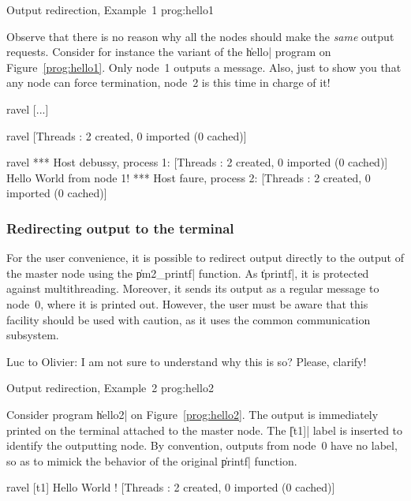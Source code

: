  {Output redirection,
  Example~1} {prog:hello1}

Observe that there is no reason why all the nodes should make the
\emph{same} output requests. Consider for instance the variant of the
\|hello| program on Figure~\ref{prog:hello1}. Only node~1 outputs a
message.  Also, just to show you that any node can force termination,
node~2 is this time in charge of it!
\begin{shell}
ravel%
[...]

ravel%
[Threads : 2 created, 0 imported (0 cached)]

ravel%
*** Host debussy, process 1:
[Threads : 2 created, 0 imported (0 cached)]
Hello World from node 1!
*** Host faure, process 2:
[Threads : 2 created, 0 imported (0 cached)]
\end{shell}

\subsubsection{Redirecting output to the terminal}

For the user convenience, it is possible to redirect output directly
to the output of the master node using the \|pm2_printf| function. As
\|tprintf|, it is protected against multithreading. Moreover, it sends
its output as a regular message to node~0, where it is printed out.
However, the user must be aware that this facility should be used with
caution, as it uses the common communication subsystem. 

\begin{note}
  Luc to Olivier: I am not sure to understand why this is so? Please,
  clarify!
\end{note}

 {Output redirection,
  Example~2} {prog:hello2}

Consider program \|hello2| on Figure~\ref{prog:hello2}. The output is
immediately printed on the terminal attached to the master node. The
\|[t1]| label is inserted to identify the outputting node. By
convention, outputs from node~0 have no label, so as to mimick the
behavior of the original \|printf| function.
\begin{shell}
ravel%
[t1] Hello World !
[Threads : 2 created, 0 imported (0 cached)]
\end{shell}


